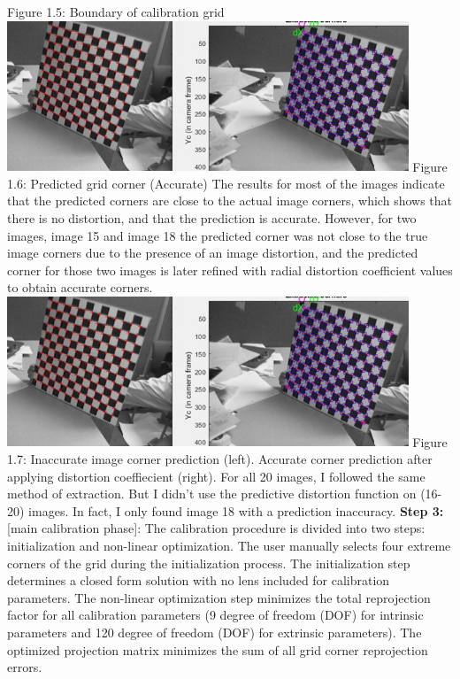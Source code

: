 \documentclass[a4paper, 12pt]{report}
\begin{document}
Figure 1.5: Boundary of calibration grid \newline \newline 
\includegraphics[width=0.9\textwidth]{resources/image/8.jpg} \newline \newline 
Figure 1.6: Predicted grid corner (Accurate) \newline \newline 
The results for most of the images indicate that the predicted corners are close to the actual image corners, which shows that there is no distortion, and that the prediction is accurate. However, for two images, image 15 and image 18 the predicted corner was not close to the true image corners due to the presence of an image distortion, and the predicted corner for those two images is later refined with radial distortion coefficient values to obtain accurate corners.\newline 
\includegraphics[width=0.9\textwidth]{resources/image/8.jpg} \newline 
Figure 1.7: Inaccurate image corner prediction (left). Accurate corner prediction after applying distortion coeffiecient (right).\newline \newline 
For all 20 images, I followed the same method of extraction. But I didn't use the predictive distortion function on (16-20) images. In fact, I only found image 18 with a prediction inaccuracy. \newline \newline \newline 
\textbf{Step 3:} [main calibration phase]: The calibration procedure is divided into two steps: initialization and non-linear optimization. The user manually selects four extreme corners of the grid during the initialization process. The initialization step determines a closed form solution with no lens included for calibration parameters. The non-linear optimization step minimizes the total reprojection factor for all calibration parameters (9 degree of freedom (DOF) for intrinsic parameters and 120 degree of freedom (DOF) for extrinsic parameters). The optimized projection matrix minimizes the sum of all grid corner reprojection errors.
\end{document}
